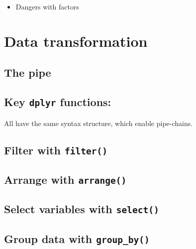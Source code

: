 \documentclass[]{book}
\providecommand{\tightlist}{%
  \setlength{\itemsep}{0pt}\setlength{\parskip}{0pt}}
\begin{document}
\begin{itemize}
\tightlist
\item
  Dangers with factors
\end{itemize}

\hypertarget{data-transformation}{%
\chapter{Data transformation}\label{data-transformation}}

\hypertarget{the-pipe}{%
\section{The pipe}\label{the-pipe}}

\hypertarget{key-dplyr-functions}{%
\section{\texorpdfstring{Key \texttt{dplyr} functions:}{Key dplyr functions:}}\label{key-dplyr-functions}}

All have the same syntax structure, which enable pipe-chains.

\hypertarget{filter-with-filter}{%
\section{\texorpdfstring{Filter with \texttt{filter()}}{Filter with filter()}}\label{filter-with-filter}}

\hypertarget{arrange-with-arrange}{%
\section{\texorpdfstring{Arrange with \texttt{arrange()}}{Arrange with arrange()}}\label{arrange-with-arrange}}

\hypertarget{select-variables-with-select}{%
\section{\texorpdfstring{Select variables with \texttt{select()}}{Select variables with select()}}\label{select-variables-with-select}}

\hypertarget{group-data-with-group_by}{%
\section{\texorpdfstring{Group data with \texttt{group\_by()}}{Group data with group\_by()}}\label{group-data-with-group_by}}
\end{document}

